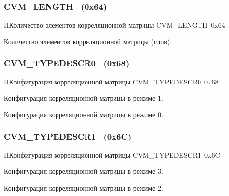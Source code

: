 \subsubsection{CVM\_LENGTH~ (0x64)}
\renewcommand{\regnam}{CVM\_LENGTH~}
\label{sec:CVM_LENGTH}

\begin{register}{H}{Количество элементов корреляционной матрицы \regnam}{0x64}

\label{regsamplecount}%
%
\regnewline%

\begin{regdesc}\begin{reglist}
\item [CVM\_LENGTH (r)]
Количество элементов корреляционной матрицы (слов).
\end{reglist}\end{regdesc}
\end{register}

\subsubsection{CVM\_TYPEDESCR0~ (0x68)}
\renewcommand{\regnam}{CVM\_TYPEDESCR0~}
\label{sec:CVM_TYPEDESCR0}

\begin{register}{H}{Конфигурация корреляционной матрицы \regnam}{0x68}

\label{regsamplecount}%
%
%
\regnewline%

\begin{regdesc}\begin{reglist}
\item [INTCNT1 (r)]
Конфигурация корреляционной матрицы в режиме 1.
\item [INTCNT0 (r)]
Конфигурация корреляционной матрицы в режиме 0.
\end{reglist}\end{regdesc}
\end{register}

\subsubsection{CVM\_TYPEDESCR1~ (0x6C)}
\renewcommand{\regnam}{CVM\_TYPEDESCR1~}
\label{sec:CVM_TYPEDESCR1}

\begin{register}{H}{Конфигурация корреляционной матрицы \regnam}{0x6C}

\label{regsamplecount}%
%
%
\regnewline%

\begin{regdesc}\begin{reglist}
\item [INTCNT3 (r)]
Конфигурация корреляционной матрицы в режиме 3.
\item [INTCNT2 (r)]
Конфигурация корреляционной матрицы в режиме 2.
\end{reglist}\end{regdesc}
\end{register}

